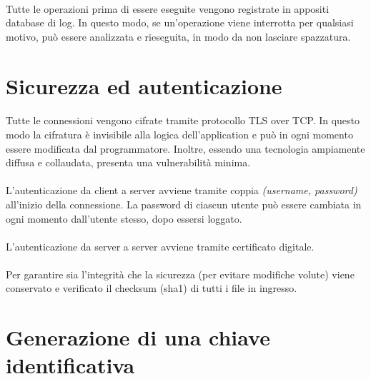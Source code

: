 \documentclass{article}
\begin{document}
\paragraph{} Tutte le operazioni prima di essere eseguite vengono registrate in appositi database di log. In questo modo, se un'operazione viene interrotta per qualsiasi motivo, può essere analizzata e rieseguita, in modo da non lasciare spazzatura. 





\section{Sicurezza ed autenticazione}

\paragraph{} Tutte le connessioni vengono cifrate tramite protocollo TLS over TCP. In questo modo la cifratura è invisibile alla logica dell'application e può in ogni momento essere modificata dal programmatore. Inoltre, essendo una tecnologia ampiamente diffusa e collaudata, presenta una vulnerabilità minima. 

\paragraph{} L'autenticazione da client a server avviene tramite coppia \emph{(username, password)} all'inizio della connessione. La password di ciascun utente può essere cambiata in ogni momento dall'utente stesso, dopo essersi loggato. 

\paragraph{} L'autenticazione da server a server avviene tramite certificato digitale.

\paragraph{} Per garantire sia l'integrità che la sicurezza (per evitare modifiche volute) viene conservato e verificato il checksum (sha1) di tutti i file in ingresso. 


\section{Generazione di una chiave identificativa}
\end{document}

